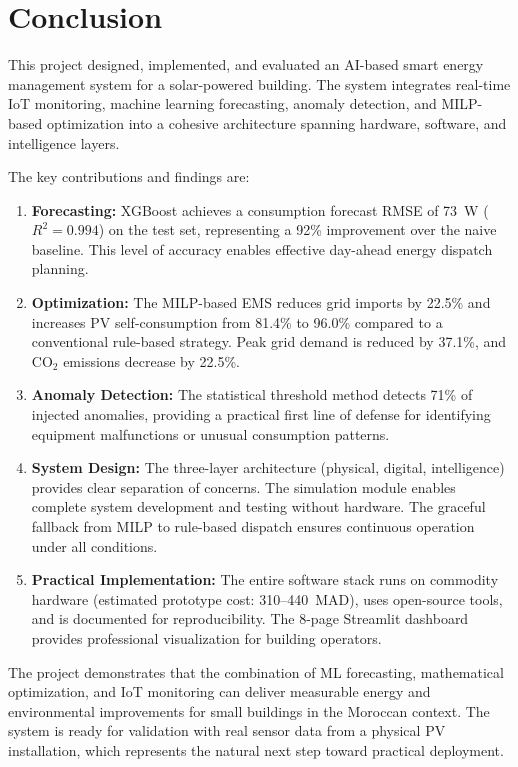\chapter{Conclusion}
\label{ch:conclusion}

This project designed, implemented, and evaluated an AI-based smart energy management system for a solar-powered building. The system integrates real-time IoT monitoring, machine learning forecasting, anomaly detection, and MILP-based optimization into a cohesive architecture spanning hardware, software, and intelligence layers.

The key contributions and findings are:

\begin{enumerate}
    \item \textbf{Forecasting:} XGBoost achieves a consumption forecast RMSE of 73~W ($R^2 = 0.994$) on the test set, representing a 92\% improvement over the naive baseline. This level of accuracy enables effective day-ahead energy dispatch planning.

    \item \textbf{Optimization:} The MILP-based EMS reduces grid imports by 22.5\% and increases PV self-consumption from 81.4\% to 96.0\% compared to a conventional rule-based strategy. Peak grid demand is reduced by 37.1\%, and CO$_2$ emissions decrease by 22.5\%.

    \item \textbf{Anomaly Detection:} The statistical threshold method detects 71\% of injected anomalies, providing a practical first line of defense for identifying equipment malfunctions or unusual consumption patterns.

    \item \textbf{System Design:} The three-layer architecture (physical, digital, intelligence) provides clear separation of concerns. The simulation module enables complete system development and testing without hardware. The graceful fallback from MILP to rule-based dispatch ensures continuous operation under all conditions.

    \item \textbf{Practical Implementation:} The entire software stack runs on commodity hardware (estimated prototype cost: 310--440~MAD), uses open-source tools, and is documented for reproducibility. The 8-page Streamlit dashboard provides professional visualization for building operators.
\end{enumerate}

The project demonstrates that the combination of ML forecasting, mathematical optimization, and IoT monitoring can deliver measurable energy and environmental improvements for small buildings in the Moroccan context. The system is ready for validation with real sensor data from a physical PV installation, which represents the natural next step toward practical deployment.
